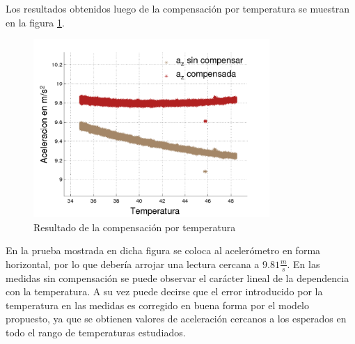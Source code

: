\documentclass[main]{subfiles}
\begin{document}
Los resultados obtenidos luego de la compensación por temperatura se muestran en la figura \ref{fig:resultado_temp}.

\begin{figure}[H]
  \begin{center}
    \includegraphics[width=0.8\textwidth]{./pics_acc/resultado_temp.pdf}
  \end{center}
  \vspace{-20pt}
  \caption{Resultado de la compensación por temperatura}
  \label{fig:resultado_temp}
\end{figure}

En la prueba mostrada en dicha figura se coloca al acelerómetro en forma horizontal, por lo que debería arrojar una lectura cercana a $9.81\frac{m}{s}$. En las medidas sin compensación se puede observar el carácter lineal de la dependencia con la temperatura. A su vez puede decirse que el error introducido por la temperatura en las medidas es corregido en buena forma por el modelo propuesto, ya que se obtienen valores de aceleración cercanos a los esperados en todo el rango de temperaturas estudiados.
\end{document}
